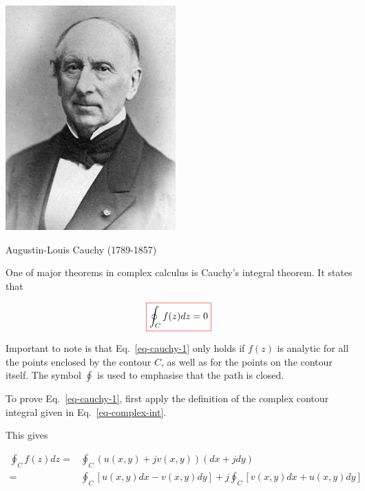 
\begin{marginfigure}[+0.0cm]
  \includegraphics{complex/figures/cauchy}
  \caption{Augustin-Louis Cauchy (1789-1857)}
\end{marginfigure}

One of major theorems in complex calculus is Cauchy's integral theorem. It states that 

\begin{equation}
\fbox{$\displaystyle
\oint_{{C}} f(z) dz = 0 \label{eq-cauchy-1}
$}
\end{equation}

Important to note is that Eq.~\ref{eq-cauchy-1} only holds if $f(z)$ is analytic for all the points enclosed by the contour ${C}$, as well as for the points on the contour itself. The symbol $\oint$ is used to emphasise that the path is closed.

\begin{cue}
To prove Eq.~\ref{eq-cauchy-1}, first apply the definition of the complex contour integral given in Eq.~\ref{eq-complex-int}.
\end{cue}

This gives

\begin{align}
\oint_{C}f(z)dz = & \oint_{C}\left(u(x,y)+jv(x,y)\right)(dx+jdy)
\nonumber \\
= & \oint_{C}\left[u(x,y)dx-v(x,y)dy\right] + j
\oint_{C}\left[v(x,y)dx+u(x,y)dy\right]  \label{eq-cauchy-proof}
\end{align}

